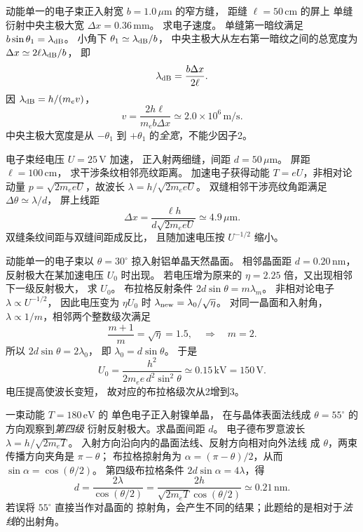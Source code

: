动能单一的电子束正入射宽
$b=1.0\,\mu\mathrm m$ 的窄方缝，
距缝 $\ell=50\,\mathrm{cm}$ 的屏上
单缝衍射中央主极大宽
$\Delta x=0.36\,\mathrm{mm}$。
求电子速度。
\exsolution
单缝第一暗纹满足
$b\sin\theta_1=\lambda_{\rm dB}$。
小角下 $\theta_1\simeq\lambda_{\rm dB}/b$，
中央主极大从左右第一暗纹之间的总宽度为
$\Delta x\simeq2\ell\lambda_{\rm dB}/b$，
即
\[
 \lambda_{\rm dB}=\frac{b\Delta x}{2\ell}.
\]
因 $\lambda_{\rm dB}=h/(m_ev)$，
\[
 \boxed{v=\frac{2h\ell}{m_eb\Delta x}
 \simeq2.0\times10^6\,\mathrm{m/s}}.
\]
\excheck 中央主极大宽度是从 $-\theta_1$ 到
$+\theta_1$ 的\emph{全宽}，不能少因子2。

电子束经电压 $U=25\,\mathrm V$ 加速，
正入射两细缝，间距
$d=50\,\mu\mathrm m$。
屏距 $\ell=100\,\mathrm{cm}$，
求干涉条纹相邻亮纹距离。
\exsolution
加速电子获得动能
$T=eU$，非相对论动量
$p=\sqrt{2m_eeU}$，故波长
$\lambda=h/\sqrt{2m_eeU}$。
双缝相邻干涉亮纹角距满足
$\Delta\theta\simeq\lambda/d$，
屏上线距
\[
 \boxed{\Delta x=
 \frac{\ell h}{d\sqrt{2m_eeU}}
 \simeq4.9\,\mu\mathrm m}.
\]
\excheck 双缝条纹间距与双缝间距成反比，
且随加速电压按 $U^{-1/2}$ 缩小。

动能单一的电子束以
$\theta=30^\circ$ 掠入射铝单晶天然晶面。
相邻晶面距 $d=0.20\,\mathrm{nm}$，
反射极大在某加速电压 $U_0$ 时出现。
若电压增为原来的
$\eta=2.25$ 倍，又出现相邻下一级反射极大，
求 $U_0$。
\exsolution
布拉格反射条件 $2d\sin\theta=m\lambda_m$。
非相对论电子
$\lambda\propto U^{-1/2}$，
因此电压变为 $\eta U_0$ 时
$\lambda_{\rm new}=\lambda_0/\sqrt\eta$。
对同一晶面和入射角，
$\lambda\propto1/m$，相邻两个整数级次满足
\[
 \frac{m+1}{m}=\sqrt\eta=1.5,
 \quad\Longrightarrow\quad m=2.
\]
所以
$2d\sin\theta=2\lambda_0$，
即 $\lambda_0=d\sin\theta$。
于是
\[
 \boxed{U_0=\frac{h^2}
 {2m_e e\,d^2\sin^2\theta}
 \simeq0.15\,\mathrm{kV}=150\,\mathrm V}.
\]
\excheck 电压提高使波长变短，
故对应的布拉格级次从2增到3。

一束动能 $T=180\,\mathrm{eV}$ 的
单色电子正入射镍单晶，
在与晶体表面法线成
$\theta=55^\circ$ 的方向观察到\emph{第四级}
衍射反射极大。求晶面间距 $d$。
\exsolution
电子德布罗意波长
$\lambda=h/\sqrt{2m_eT}$。
入射方向沿向内的晶面法线、反射方向相对向外法线
成 $\theta$，两束传播方向夹角是 $\pi-\theta$；
布拉格掠射角为
$\alpha=(\pi-\theta)/2$，从而
$\sin\alpha=\cos(\theta/2)$。
第四级布拉格条件
$2d\sin\alpha=4\lambda$，得
\[
 \boxed{d=\frac{2\lambda}{\cos(\theta/2)}
 =\frac{2h}{\sqrt{2m_eT}\cos(\theta/2)}
 \simeq0.21\,\mathrm{nm}}.
\]
\excheck 若误将 $55^\circ$ 直接当作对晶面的
掠射角，会产生不同的结果；此题给的是相对于\emph{法线}的出射角。

